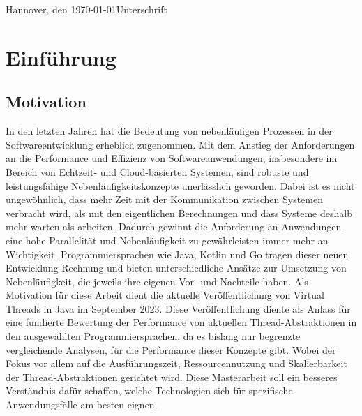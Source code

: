 \documentclass[fontsize=12pt,paper=a4,twoside=semi,parskip=half-,headsepline,headinclude]{scrreprt}
\begin{document}
Hannover, den \today \hfill Unterschrift


\newpage 
\thispagestyle{empty}
\quad 
\newpage


\tableofcontents  %

\listoffigures      %

\listoftables       %

\newpage


\chapter{Einführung}

\section{Motivation}

In den letzten Jahren hat die Bedeutung von nebenläufigen Prozessen in der Softwareentwicklung erheblich zugenommen. Mit dem Anstieg der Anforderungen an die Perfor\-mance und Effizienz von Softwareanwendungen, insbesondere im Bereich von Echtzeit- und Cloud-basierten Systemen, sind robuste und leistungsfähige Nebenläufigkeits\-kon\-zep\-te unerlässlich geworden. Dabei ist es nicht ungewöhnlich, dass mehr Zeit mit der Kommunikation zwischen Systemen verbracht wird, als mit den eigentlichen Berechnungen und dass Systeme deshalb mehr warten als arbeiten. Dadurch gewinnt die Anforderung an Anwendungen eine hohe Parallelität und Nebenläufigkeit zu gewährleisten immer mehr an Wichtigkeit. Programmiersprachen wie Java, Kotlin und Go tragen dieser neuen Entwicklung Rechnung und bieten unterschiedliche Ansätze zur Umsetzung von Nebenläufigkeit, die jeweils ihre eigenen Vor- und Nachteile haben. Als Motivation für diese Arbeit dient die aktuelle Veröffentlichung von Virtual Threads in Java im September 2023. Diese Veröffentlichung diente als Anlass für eine fundierte Bewertung der Performance von aktuellen Thread-Abstraktionen in den ausgewählten Programmiersprachen, da es bislang nur begrenzte vergleichende Analysen, für die Performance dieser Konzepte gibt. Wobei der Fokus vor allem auf die Ausführungszeit, Ressourcennutzung und Skalierbarkeit der Thread-Abstraktionen gerichtet wird. Diese Masterarbeit soll ein besseres Verständnis dafür schaffen, welche Technologien sich für spezifische Anwendungsfälle am besten eignen.
\end{document}
